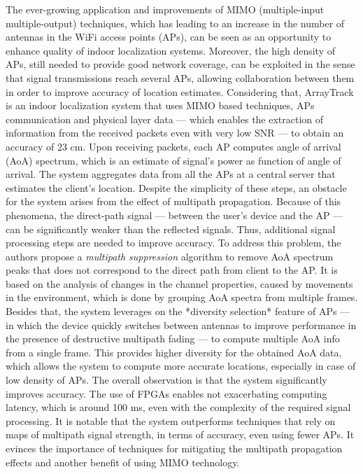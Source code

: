     
    The ever-growing application and improvements of MIMO (multiple-input multiple-output) techniques, which has leading to an increase in the number of antennas in the WiFi access points (APs), can be seen as an opportunity to enhance quality of indoor localization systems. Moreover, the high density of APs, still needed to provide good network coverage, can be exploited in the sense that signal transmissions reach several APs, allowing collaboration between them in order to improve accuracy of location estimates. Considering that, ArrayTrack \cite{arrayTrack} is an indoor localization system that uses MIMO based techniques, APs communication and physical layer data — which enables the extraction of information from the received packets even with very low SNR — to obtain an accuracy of 23 cm.
    Upon receiving packets, each AP computes angle of arrival (AoA) spectrum, which is an estimate of signal's power as function of angle of arrival. The system aggregates data from all the APs at a central server that estimates the client's location. Despite the simplicity of these steps, an obstacle for the system arises from the effect of multipath propagation. Because of this phenomena, the direct-path signal — between the user's device and the AP — can be significantly weaker than the reflected signals. Thus, additional signal processing steps are needed to improve accuracy. To address this problem, the authors propose a \textit{multipath suppression} algorithm to remove AoA spectrum peaks that does not correspond to the direct path from client to the AP. It is based on the analysis of changes in the channel properties, caused by movements in the environment, which is done by grouping AoA spectra from multiple frames. Besides that, the system leverages on the *diversity selection* feature of APs — in which the device quickly switches between antennas to improve performance in the presence of destructive multipath fading — to compute multiple AoA info from a single frame. This provides higher diversity for the obtained AoA data, which allows the system to compute more accurate locations, especially in case of low density of APs.
    The overall observation is that the system significantly improves accuracy. The use of FPGAs enables not exacerbating computing latency, which is around 100 ms, even with the complexity of the required signal processing. It is notable that the system outperforms techniques that rely on maps of multipath signal strength, in terms of accuracy, even using fewer APs. It evinces the importance of techniques for mitigating the multipath propagation effects and another benefit of using MIMO technology.

